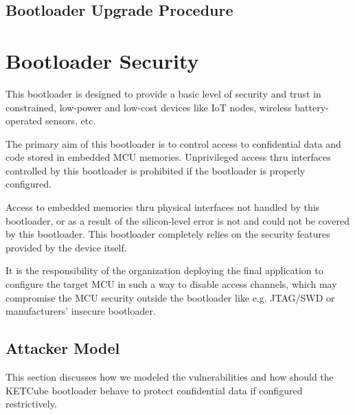 
\subsection{Bootloader Upgrade Procedure}

\clearpage
\section{Bootloader Security} \label{sec:security}

This bootloader is designed to provide a basic level of security and trust in constrained,
low-power and low-cost devices like IoT nodes, wireless battery-operated sensors, etc.

The primary aim of this bootloader is to control access to confidential data and code stored in embedded MCU memories.
Unprivileged access thru interfaces controlled by this bootloader is prohibited if the bootloader is properly configured.

Access to embedded memories thru physical interfaces not handled by this bootloader, 
or as a result of the silicon-level error is not and could not be covered by this bootloader. 
This bootloader completely relies on the security features provided by the device itself.

It is the responsibility of the organization deploying the final application to configure the target MCU
in such a way to disable access channels, which may compromise the MCU security outside the bootloader like
e.g. JTAG/SWD or manufacturers' insecure bootloader.

\subsection{Attacker Model} \label{sec:security:model}

This section discusses how we modeled the vulnerabilities and how should the KETCube bootloader behave to protect confidential data if configured restrictively.

